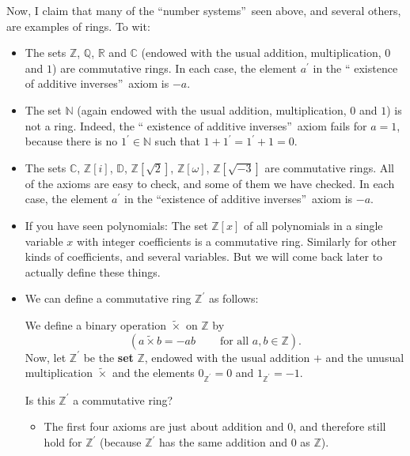 \documentclass[numbers=enddot,12pt,final,onecolumn,notitlepage]{scrartcl}%
\numberwithin{exer}{subsection}
\theoremstyle{definition}
\begin{document}
Now, I claim that many of the \textquotedblleft number
systems\textquotedblright\ seen above, and several others, are examples of
rings. To wit:

\begin{itemize}
\item The sets $\mathbb{Z}$, $\mathbb{Q}$, $\mathbb{R}$ and $\mathbb{C}$
(endowed with the usual addition, multiplication, $0$ and $1$) are commutative
rings. In each case, the element $a^{\prime}$ in the \textquotedblleft
existence of additive inverses\textquotedblright\ axiom is $-a$.

\item The set $\mathbb{N}$ (again endowed with the usual addition,
multiplication, $0$ and $1$) is not a ring. Indeed, the \textquotedblleft
existence of additive inverses\textquotedblright\ axiom fails for $a=1$,
because there is no $1^{\prime}\in\mathbb{N}$ such that $1+1^{\prime
}=1^{\prime}+1=0$.

\item The sets $\mathbb{C}$, $\mathbb{Z}\left[  i\right]  $, $\mathbb{D}$,
$\mathbb{Z}\left[  \sqrt{2}\right]  $, $\mathbb{Z}\left[  \omega\right]  $,
$\mathbb{Z}\left[  \sqrt{-3}\right]  $ are commutative rings. All of the
axioms are easy to check, and some of them we have checked. In each case, the
element $a^{\prime}$ in the \textquotedblleft existence of additive
inverses\textquotedblright\ axiom is $-a$.

\item If you have seen polynomials: The set $\mathbb{Z}\left[  x\right]  $ of
all polynomials in a single variable $x$ with integer coefficients is a
commutative ring. Similarly for other kinds of coefficients, and several
variables. But we will come back later to actually define these things.

\item We can define a commutative ring $\mathbb{Z}^{\prime}$ as follows:

We define a binary operation $\widetilde{\times}$ on $\mathbb{Z}$ by%
\[
\left(  a\widetilde{\times}b=-ab\ \ \ \ \ \ \ \ \ \ \text{for all }%
a,b\in\mathbb{Z}\right)  .
\]
Now, let $\mathbb{Z}^{\prime}$ be the \textbf{set} $\mathbb{Z}$, endowed with
the usual addition $+$ and the unusual multiplication $\widetilde{\times}$ and
the elements $0_{\mathbb{Z}^{\prime}}=0$ and $1_{\mathbb{Z}^{\prime}}=-1$.

Is this $\mathbb{Z}^{\prime}$ a commutative ring?

\begin{itemize}
\item The first four axioms are just about addition and $0$, and therefore
still hold for $\mathbb{Z}^{\prime}$ (because $\mathbb{Z}^{\prime}$ has the
same addition and $0$ as $\mathbb{Z}$).


\end{itemize}
\end{itemize}
\end{document}

